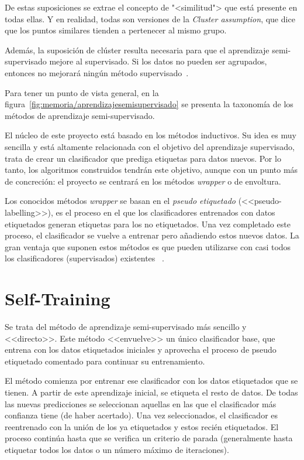 De estas suposiciones se extrae el concepto de "<similitud"> que está presente
en todas ellas. Y en realidad, todas son versiones de la \textit{Cluster
assumption}, que dice que los puntos similares tienden a pertenecer al mismo
grupo. 

Además, la suposición de clúster resulta necesaria para que el aprendizaje
semi-supervisado mejore al supervisado. Si los datos no pueden ser agrupados,
entonces no mejorará ningún método supervisado~\cite{vanEngelen2020}.


Para tener un punto de vista general, en la figura~\ref{fig:memoria/aprendizajesemisupervisado} se presenta la
taxonomía de los métodos de aprendizaje semi-supervisado.


El núcleo de este proyecto está basado en los métodos inductivos. Su idea es muy
sencilla y está altamente relacionada con el objetivo del aprendizaje
supervisado, trata de crear un clasificador que prediga etiquetas para datos
nuevos. Por lo tanto, los algoritmos construidos tendrán este objetivo, aunque
con un punto más de concreción: el proyecto se centrará en los métodos
\emph{wrapper} o de envoltura.

Los conocidos métodos \emph{wrapper} se basan en el \textit{pseudo etiquetado}
(<<pseudo-labelling>>), es el proceso en el que los clasificadores entrenados
con datos etiquetados generan etiquetas para los no etiquetados. Una vez
completado este proceso, el clasificador se vuelve a entrenar pero añadiendo
estos nuevos datos. La gran ventaja que suponen estos métodos es que pueden
utilizarse con casi todos los clasificadores (supervisados) existentes
~\cite{vanEngelen2020}.

\section{Self-Training}
Se trata del método de aprendizaje semi-supervisado más sencillo y <<directo>>.
Este método <<envuelve>> un único clasificador base, que entrena con los datos
etiquetados iniciales y aprovecha el proceso de pseudo etiquetado comentado para
continuar su entrenamiento.

El método comienza por entrenar ese clasificador con los datos etiquetados que
se tienen. A partir de este aprendizaje inicial, se etiqueta el resto de datos.
De todas las nuevas predicciones se seleccionan aquellas en las que el
clasificador más confianza tiene (de haber acertado). Una vez seleccionados, el
clasificador es reentrenado con la unión de los ya etiquetados y estos recién
etiquetados. El proceso continúa hasta que se verifica un criterio de parada
(generalmente hasta etiquetar todos los datos o un número máximo de
iteraciones).

